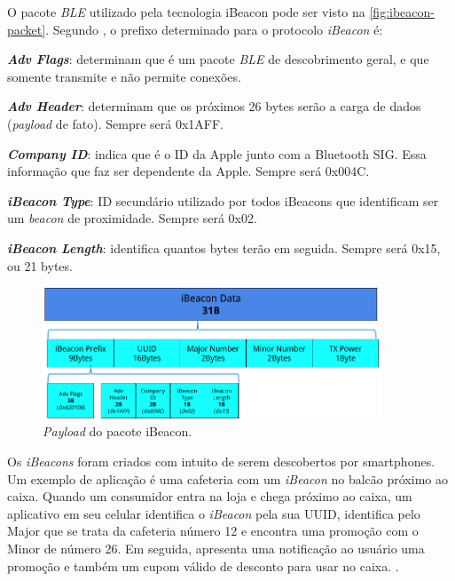 \documentclass[
		12pt,				%
		openright,			%
		oneside,			%
		a4paper,			%
		chapter=TITLE,		%
		english,			%
		brazil				%
	]{abntex2}
\begin{document}
O pacote \textit{BLE} utilizado pela tecnologia iBeacon pode ser visto na \autoref{fig:ibeacon-packet}. Segundo , o prefixo determinado para o protocolo \textit{iBeacon} é:

\begin{alineas}
	\item \textit{\textbf{Adv Flags}}: determinam que é um pacote \textit{BLE} de descobrimento geral, e que somente transmite e não permite conexões.
	\item \textit{\textbf{Adv Header}}: determinam que os próximos 26 bytes serão a carga de dados (\textit{payload} de fato). Sempre será 0x1AFF.
	\item \textit{\textbf{Company ID}}: indica que é o ID da Apple junto com a Bluetooth SIG. Essa informação que faz ser dependente da Apple. Sempre será 0x004C.
	\item\textit{\textbf{iBeacon Type}}: ID secundário utilizado por todos iBeacons que identificam ser um \textit{beacon} de proximidade. Sempre será 0x02.
	\item\textit{\textbf{iBeacon Length}}: identifica quantos bytes terão em seguida. Sempre será 0x15, ou 21 bytes.
\end{alineas}

\begin{figure}[htb]
	\caption{\label{fig:ibeacon-packet}\textit{Payload} do pacote iBeacon.}
	\begin{center}
		\includegraphics[width=0.9\textwidth]{img/ibeacon-packet.png}
	\end{center}
\end{figure}

Os \textit{iBeacons} foram criados com intuito de serem descobertos por smartphones. Um exemplo de aplicação é uma cafeteria com um \textit{iBeacon} no balcão próximo ao caixa. Quando um consumidor entra na loja e chega próximo ao caixa, um aplicativo em seu celular identifica o \textit{iBeacon} pela sua UUID, identifica pelo Major que se trata da cafeteria número 12 e encontra uma promoção com o Minor de número 26. Em seguida, apresenta uma notificação ao usuário uma promoção e também um cupom válido de desconto para usar no caixa. \cite{arm-beacons}.
\end{document}
